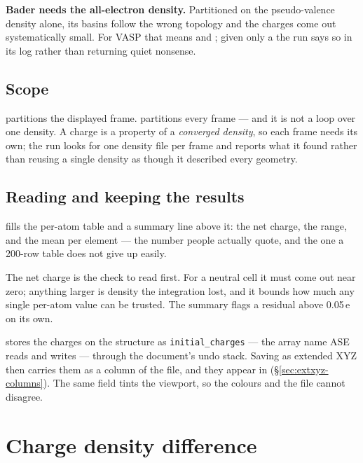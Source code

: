 \begin{calwarn}
\textbf{Bader needs the all-electron density.} Partitioned on the
pseudo-valence density alone, its basins follow the wrong topology and the
charges come out systematically small. For VASP that means  and
; given only a  the run says so in its log rather
than returning quiet nonsense.
\end{calwarn}

\subsection{Scope}

 partitions the displayed frame.  partitions every frame --- and it is not a loop over one
density. A charge is a property of a \emph{converged density}, so each frame
needs its own; the run looks for one density file per frame and reports what
it found rather than reusing a single density as though it described every
geometry.

\subsection{Reading and keeping the results}

 fills the per-atom table and a summary line above it:
the net charge, the range, and the mean per element --- the number people
actually quote, and the one a 200-row table does not give up easily.

\begin{caltip}
The net charge is the check to read first. For a neutral cell it must come out
near zero; anything larger is density the integration lost, and it bounds how
much any single per-atom value can be trusted. The summary flags a residual
above 0.05\,e on its own.
\end{caltip}

 stores the charges on the structure as
\texttt{initial\_charges} --- the array name ASE reads and writes --- through
the document's undo stack. Saving as extended XYZ then carries them as a
column of the file, and they appear in 
(\S\ref{sec:extxyz-columns}). The same field tints the viewport, so the
colours and the file cannot disagree.

\section{Charge density difference}
\label{sec:cdd}

